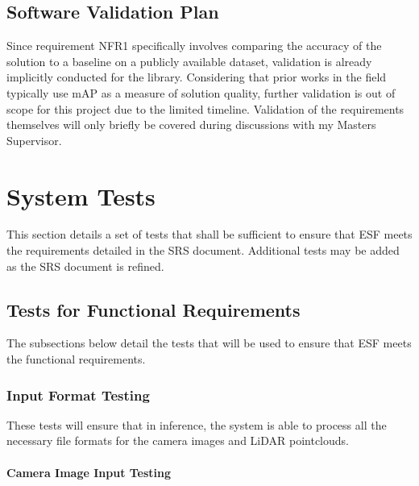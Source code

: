 \documentclass[12pt, titlepage]{article}
\newcommand{\ProjectName}{ESF }
\begin{document}
\subsection{Software Validation Plan}

Since requirement NFR1 specifically involves comparing the accuracy of the solution
to a baseline on a publicly available dataset, validation is already implicitly conducted for the library.
Considering that prior works in the field typically use mAP as a measure of solution quality, further validation
is out of scope for this project due to the limited timeline. Validation of the requirements themselves will only 
briefly be covered during discussions with my Masters Supervisor.

\section{System Tests} \label{System_Tests}

This section details a set of tests that shall be sufficient to ensure that \ProjectName{}meets the requirements detailed in the SRS document.
Additional tests may be added as the SRS document is refined.

\subsection{Tests for Functional Requirements}
The subsections below detail the tests that will be used to ensure that \ProjectName{}meets the functional requirements.

\subsubsection{Input Format Testing}

These tests will ensure that in inference, the system is able to process all the necessary
file formats for the camera images and LiDAR pointclouds.
		
\paragraph{Camera Image Input Testing}
\end{document}
